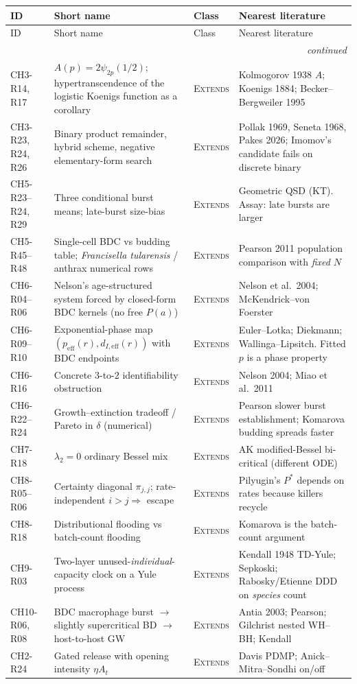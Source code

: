 \documentclass[11pt,a4paper]{report}
\newcommand{\ft}{\textit{Francisella tularensis}}
\newcommand{\cls}[1]{\textsc{#1}}
\newcommand{\ext}{\cls{Extends}}
\newcommand{\itemhead}{%
  \toprule
  ID & Short name & Class & Nearest literature \\
  \midrule
  \endfirsthead
  \toprule
  ID & Short name & Class & Nearest literature \\
  \midrule
  \endhead
  \midrule
  \multicolumn{4}{r}{\footnotesize\itshape continued} \\
  \endfoot
  \bottomrule
  \endlastfoot
}
\newcommand{\itemtable}{\begin{longtable}{L{1.55cm}L{4.35cm}L{2.35cm}L{6.55cm}}}
\begin{document}
\itemtable
\itemhead
CH3-R14, R17 &
\(A(p)=2\psi_{2p}(1/2)\); hypertranscendence of the logistic Koenigs
function as a corollary &
\ext &
Kolmogorov 1938 \(A\); Koenigs 1884; Becker--Bergweiler 1995 \\
CH3-R23, R24, R26 &
Binary product remainder, hybrid scheme, negative elementary-form search &
\ext &
Pollak 1969, Seneta 1968, Pakes 2026; Imomov's candidate fails on discrete
binary \\
CH5-R23--R24, R29 &
Three conditional burst means; late-burst size-bias &
\ext &
Geometric QSD (KT). Assay: late bursts are larger \\
CH5-R45--R48 &
Single-cell BDC vs budding table; \ft{} / anthrax numerical rows &
\ext &
Pearson 2011 population comparison with \emph{fixed} \(N\) \\
CH6-R04--R06 &
Nelson's age-structured system forced by closed-form BDC kernels (no free
\(P(a)\)) &
\ext &
Nelson et al.\ 2004; McKendrick--von Foerster \\
CH6-R09--R10 &
Exponential-phase map \((p_{\mathrm{eff}}(r), d_{I,\mathrm{eff}}(r))\)
with BDC endpoints &
\ext &
Euler--Lotka; Diekmann; Wallinga--Lipsitch. Fitted \(p\) is a phase
property \\
CH6-R16 &
Concrete 3-to-2 identifiability obstruction &
\ext &
Nelson 2004; Miao et al.\ 2011 \\
CH6-R22--R24 &
Growth--extinction tradeoff / Pareto in \(\delta\) (numerical) &
\ext &
Pearson slower burst establishment; Komarova budding spreads faster \\
CH7-R18 &
\(\lambda_2=0\) ordinary Bessel mix &
\ext &
AK modified-Bessel bi-critical (different ODE) \\
CH8-R05--R06 &
Certainty diagonal \(\pi_{j,j}\); rate-independent \(i>j\Rightarrow\)
escape &
\ext &
Pilyugin's \(P^\ast\) depends on rates because killers recycle \\
CH8-R18 &
Distributional flooding vs batch-count flooding &
\ext &
Komarova is the batch-count argument \\
CH9-R03 &
Two-layer unused-\emph{individual}-capacity clock on a Yule process &
\ext &
Kendall 1948 TD-Yule; Sepkoski; Rabosky/Etienne DDD on \emph{species}
count \\
CH10-R06, R08 &
BDC macrophage burst \(\to\) slightly supercritical BD \(\to\) host-to-host
GW &
\ext &
Antia 2003; Pearson; Gilchrist nested WH--BH; Kendall \\
CH2-R24 &
Gated release with opening intensity \(\eta A_t\) &
\ext &
Davis PDMP; Anick--Mitra--Sondhi on/off \\
\end{longtable}
\end{document}
